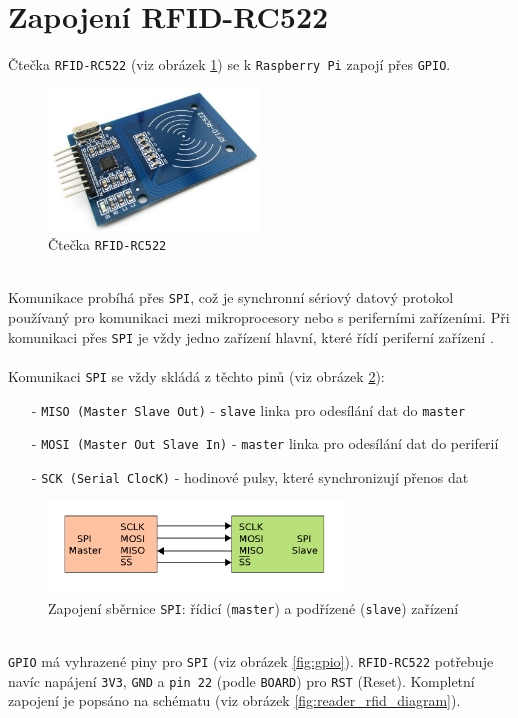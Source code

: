 \documentclass[czech,BP]{thesiskiv}
\begin{document}
		\section{Zapojení RFID-RC522}
Čtečka \texttt{RFID-RC522} (viz obrázek \ref{fig:rfid_rc522}) se k \texttt{Raspberry Pi} zapojí přes \texttt{GPIO}. 
\begin{figure}[H]
		\centering
		\includegraphics[width=0.50\textwidth]{../images/rfid_rc522.jpg}	
		\caption{Čtečka \texttt{RFID-RC522}}
		\label{fig:rfid_rc522}
	\end{figure}
\ \\
Komunikace probíhá přes \texttt{SPI}, což je synchronní sériový datový protokol používaný pro komunikaci mezi mikroprocesory nebo s periferními zařízeními.
Při komunikaci přes \texttt{SPI} je vždy jedno zařízení hlavní, které řídí periferní zařízení \cite{upton2014raspberry}.\\\\
Komunikaci \texttt{SPI} se vždy skládá z těchto pinů (viz obrázek \ref{fig:spi}):			
\begin{itemize}[noitemsep]
\item [-] \texttt{MISO (Master Slave Out)} - \texttt{slave} linka pro odesílání dat do \texttt{master}
\item [-] \texttt{MOSI (Master Out Slave In)} - \texttt{master} linka pro odesílání dat do periferií
\item [-] \texttt{SCK (Serial ClocK)} - hodinové pulsy, které synchronizují přenos dat 
\end{itemize}
						
	\begin{figure}[H]
		\centering
		\includegraphics[width=0.7\textwidth]{../images/spi.png}	
		\caption{Zapojení sběrnice \texttt{SPI}: řídicí (\texttt{master}) a podřízené (\texttt{slave}) zařízení}
		\label{fig:spi}
	\end{figure}
\ \\
\texttt{GPIO} má vyhrazené piny pro \texttt{SPI} (viz obrázek \ref{fig:gpio}). \texttt{RFID-RC522} potřebuje navíc napájení \texttt{3V3}, \texttt{GND} a \texttt{pin 22} (podle \texttt{BOARD}) pro \texttt{RST} (Reset). Kompletní zapojení je popsáno na schématu (viz obrázek \ref{fig:reader_rfid_diagram}).
\end{document}
